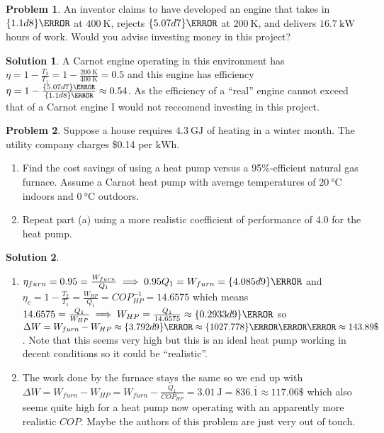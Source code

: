 \documentclass[10pt]{article}
\theoremstyle{definition}
\newtheorem{problem}{Problem}
\newtheorem{soln}{Solution}
\begin{document}
\begin{problem}
An inventor claims to have developed an engine that takes in $\qty{1.1d8}{\joule}$ at $\qty{400}{\kelvin}$,
rejects $\qty{5.07d7}{\joule}$ at $\qty{200}{\kelvin}$, and delivers $\qty{16.7}{\kilo\watt}$ hours of work.
Would you advise investing money in this project?
\end{problem}
\begin{soln}
  A Carnot engine operating in this environment has $\eta=1-\frac{T_2}{T_1}=1-\frac{\qty{200}{\kelvin}}{\qty{400}{\kelvin}}=0.5$ and this engine has efficiency
  $\eta=1-\frac{\qty{5.07d7}{\joule}}{\qty{1.1d8}{\joule}}\approx0.54$. As the efficiency of a ``real'' engine cannot exceed that of a Carnot engine I would not
  reccomend investing in this project.
\end{soln}

\begin{problem}
Suppose a house requires $\qty{4.3}{\giga\joule}$ of heating in a winter month. The
utility company charges \$0.14 per $\unit{\kilo\watt\hour}$.
\begin{enumerate}[label=(\alph*)]
  \item Find the cost savings of using a heat pump versus a 95\%-efficient natural gas furnace. Assume
        a Carnot heat pump with average temperatures of $\qty{20}{\degreeCelsius}$ indoors and $\qty{0}{\degreeCelsius}$ outdoors.
  \item Repeat part (a) using a more realistic coefficient of performance of 4.0 for the heat pump.
\end{enumerate}
\end{problem}
\begin{soln}~
  \begin{enumerate}[label=(\alph*)]
    \item $\eta_{furn}=0.95=\frac{W_{furn}}{Q_1}\implies 0.95Q_1=W_{furn}=\qty{4.085d9}{\joule}$ and $\eta_c=1-\frac{T_2}{T_1}=\frac{W_{HP}}{Q_1}=COP_{HP}^{-1}=14.6575$ which means $14.6575=\frac{Q_1}{W_{HP}}\implies W_{HP}=\frac{Q_1}{14.6575}\approx\qty{0.2933d9}{\joule}$
          so $\Delta W=W_{furn}-W_{HP}\approx\qty{3.792d9}{\joule}\approx\qty{1027.778}{\kilo\watt\hour}\approx143.89\$$. Note that this seems very high but this is an ideal heat pump working in decent conditions
          so it could be ``realistic''.
    \item The work done by the furnace stays the same so we end up with $\Delta W=W_{furn}-W_{HP}=W_{furn}-\frac{Q_1}{COP_{HP}}=\qty{3.01}{\joule}= 836.\overline{1}\approx 117.06\$$ which also seems quite high for a heat pump now operating with an apparently
    more realistic $COP$. Maybe the authors of this problem are just very out of touch.
  \end{enumerate}
\end{soln}
\end{document}
